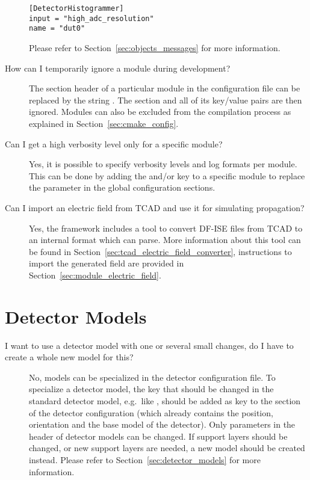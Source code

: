 \begin{description}
\begin{verbatim}
[DetectorHistogrammer]
input = "high_adc_resolution"
name = "dut0"
\end{verbatim}
Please refer to Section~\ref{sec:objects_messages} for more information.
\item[How can I temporarily ignore a module during development?]
The section header of a particular module in the configuration file can be replaced by the string .
The section and all of its key/value pairs are then ignored.
Modules can also be excluded from the compilation process as explained in Section~\ref{sec:cmake_config}.
\item[Can I get a high verbosity level only for a specific module?]
Yes, it is possible to specify verbosity levels and log formats per module.
This can be done by adding the  and/or  key to a specific module to replace the parameter in the global configuration sections.

\item[Can I import an electric field from TCAD and use it for simulating propagation?]
Yes, the framework includes a tool to convert DF-ISE files from TCAD to an internal format which \apsq can parse.
More information about this tool can be found in Section~\ref{sec:tcad_electric_field_converter}, instructions to import the generated field are provided in Section~\ref{sec:module_electric_field}.
\end{description}

\section{Detector Models}
\begin{description}
\item[I want to use a detector model with one or several small changes, do I have to create a whole new model for this?] No, models can be specialized in the detector configuration file.
To specialize a detector model, the key that should be changed in the standard detector model, e.g.\ like , should be added as key to the section of the detector configuration (which already contains the position, orientation and the base model of the detector).
Only parameters in the header of detector models can be changed.
If support layers should be changed, or new support layers are needed, a new model should be created instead.
Please refer to Section~\ref{sec:detector_models} for more information.
\end{description}

